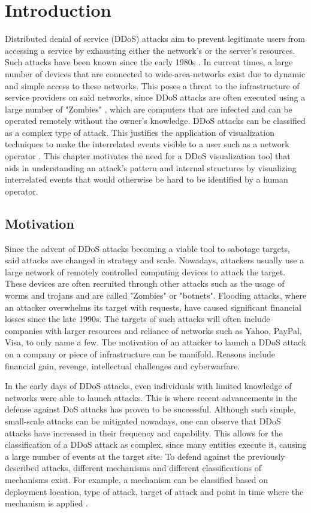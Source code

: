 \chapter{Introduction}
Distributed denial of service (DDoS) attacks aim to prevent legitimate users from accessing a service by exhausting either the network's or the server's resources. Such attacks have been known since the early 1980s \cite{zargar}. In current times, a large number of devices that are connected to wide-area-networks exist due to dynamic and simple access to these networks. This poses a threat to the infrastructure of service providers on said networks, since DDoS attacks are often executed using a large number of "Zombies" \cite{zargar} \cite{kamboj}, which are computers that are infected and can be operated remotely without the owner's knowledge. DDoS attacks can be classified as a complex type of attack. This justifies the application of visualization techniques to make the interrelated events visible to a user such as a network operator \cite{yelizarov}.  This chapter motivates the need for a DDoS visualization tool that aids in understanding an attack's pattern and internal structures by visualizing interrelated events that would otherwise be hard to be identified by a human operator.

\section{Motivation}
Since the advent of DDoS attacks becoming a viable tool to sabotage targets, said attacks ave changed in strategy and scale. Nowadays, attackers usually use a large network of remotely controlled computing devices to attack the target. These devices are often recruited through other attacks such as the usage of worms and trojans and are called "Zombies" or "botnets".
Flooding attacks, where an attacker overwhelms its target with requests, have caused significant financial losses since the late 1990s. The targets of such attacks will often include companies with larger resources and reliance of networks such as Yahoo, PayPal, Visa, to only name a few. The motivation of an attacker to launch a DDoS attack on a company or piece of infrastructure can be manifold. Reasons include financial gain, revenge, intellectual challenges and cyberwarfare.

In the early days of DDoS attacks, even individuals with limited knowledge of networks were able to launch attacks. This is where recent advancements in the defense against DoS attacks has proven to be successful. Although such simple, small-scale attacks can be mitigated nowadays, one can observe that DDoS attacks have increased in their frequency and capability\cite{zargar}.
This allows for the classification of a DDoS attack as complex, since many entities execute it, causing a large number of events at the target site\cite{yelizarov}.
To defend against the previously described attacks, different mechanisms and different classifications of mechanisms exist. For example, a mechanism can be classified based on deployment location, type of attack, target of attack and point in time where the mechanism is applied \cite{zargar}.


